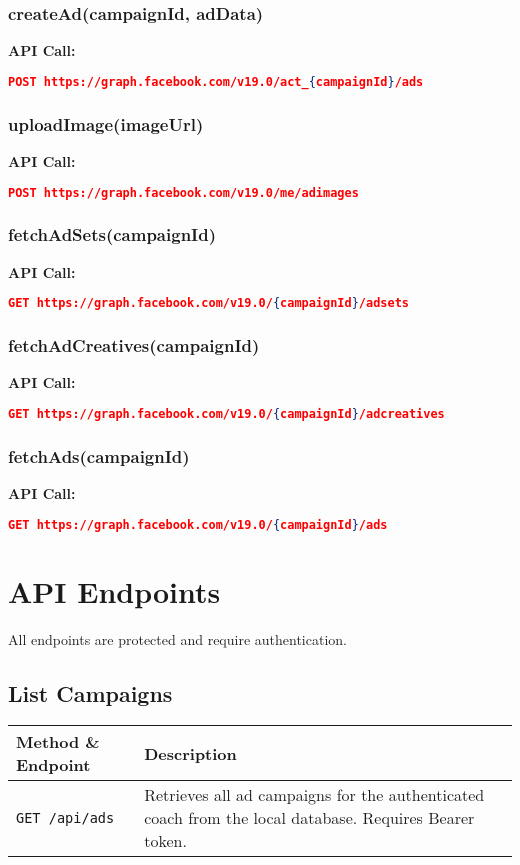 \documentclass[11pt,a4paper]{article}
\begin{document}
\subsubsection{createAd(campaignId, adData)}
\textbf{API Call:}
\begin{lstlisting}[language=json]
POST https://graph.facebook.com/v19.0/act_{campaignId}/ads
\end{lstlisting}

\subsubsection{uploadImage(imageUrl)}
\textbf{API Call:}
\begin{lstlisting}[language=json]
POST https://graph.facebook.com/v19.0/me/adimages
\end{lstlisting}

\subsubsection{fetchAdSets(campaignId)}
\textbf{API Call:}
\begin{lstlisting}[language=json]
GET https://graph.facebook.com/v19.0/{campaignId}/adsets
\end{lstlisting}

\subsubsection{fetchAdCreatives(campaignId)}
\textbf{API Call:}
\begin{lstlisting}[language=json]
GET https://graph.facebook.com/v19.0/{campaignId}/adcreatives
\end{lstlisting}

\subsubsection{fetchAds(campaignId)}
\textbf{API Call:}
\begin{lstlisting}[language=json]
GET https://graph.facebook.com/v19.0/{campaignId}/ads
\end{lstlisting}

\section{API Endpoints}
All endpoints are protected and require authentication.

\subsection{List Campaigns}
\begin{longtable}{L{3cm}Y}
\toprule
\textbf{Method \& Endpoint} & \textbf{Description} \\
\midrule
\texttt{GET /api/ads} & Retrieves all ad campaigns for the authenticated coach from the local database. Requires Bearer token. \\
\bottomrule
\end{longtable}
\end{document}
